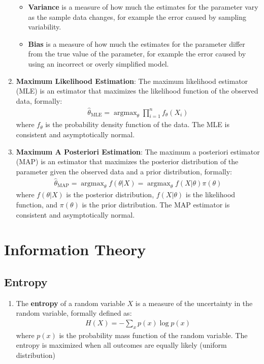 \documentclass[letterpaper, 11pt]{article}
\newcommand{\1}{\mathds{1}}	%
\DeclareMathOperator*{\argmax}{argmax}		%
\theoremstyle{definition}
\begin{document}
\begin{enumerate}
\begin{itemize}
        \item \textbf{Variance} is a measure of how much the estimates for the parameter vary as the sample data changes, 
        for example the error caused by sampling variability.
        \item \textbf{Bias} is a measure of how much the estimates for the parameter differ from the true value of the parameter,
        for example the error caused by using an incorrect or overly simplified model.
    \end{itemize}
    \item \textbf{Maximum Likelihood Estimation}: The maximum likelihood estimator (MLE) is an estimator that maximizes the likelihood function of the observed data, 
    formally:
    \begin{align}
        \hat{\theta}_{\text{MLE}} = \argmax_{\theta} \prod_{i=1}^{n} f_{\theta}(X_i)
    \end{align}
    where $f_{\theta}$ is the probability density function of the data. The MLE is consistent and asymptotically normal.
    \item \textbf{Maximum A Posteriori Estimation}: The maximum a posteriori estimator (MAP) is an estimator that maximizes the posterior distribution of the parameter given the observed data
    and a prior distribution, formally:
    \begin{align}
        \hat{\theta}_{\text{MAP}} = \argmax_{\theta} f(\theta | X) = \argmax_{\theta} f(X | \theta) \pi(\theta)
    \end{align}
    where $f(\theta | X)$ is the posterior distribution, $f(X | \theta)$ is the likelihood function, and $\pi(\theta)$ is the prior distribution. The MAP estimator is consistent and asymptotically normal.

\end{enumerate}

\section{Information Theory}
\subsection{Entropy}
\begin{enumerate}
    \item The \textbf{entropy} of a random variable $X$ is a measure of the uncertainty in the random variable, formally defined as:
    \begin{align}
        H(X) = -\sum_{x} p(x) \log p(x)
    \end{align}
    where $p(x)$ is the probability mass function of the random variable. The entropy is maximized when all outcomes are equally likely (uniform distribution)
\end{enumerate}
\end{document}
